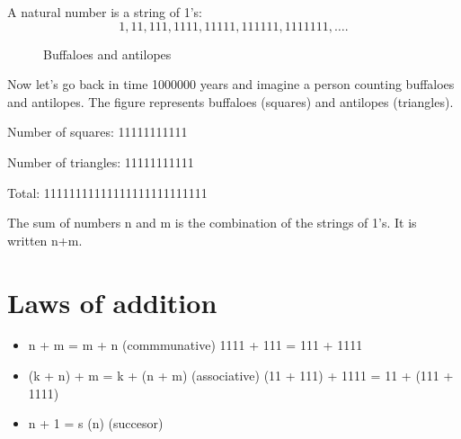 
\begin{definition}
    A natural number is a string of 1's:
    \[
        1,11,111,1111,11111,111111,1111111, \ldots
    .\]
\end{definition}


\begin{figure}[ht]
    \centering
    \caption{Buffaloes and antilopes}
    \label{fig:buffaloes-and-antilopes}
\end{figure}

Now let's go back in time 1000000 years and imagine a person counting buffaloes and antilopes.
The figure represents buffaloes (squares) and antilopes (triangles).

Number of squares: 11111111111

Number of triangles: 11111111111

Total: 11111111111111111111111111

\begin{definition}
    The sum of numbers n and m is the combination of the strings of 1's. It is
    written n+m.
\end{definition}

\section*{Laws of addition}
\begin{itemize}
    \item n + m = m + n (commmunative) \hspace{10} 1111 + 111 = 111 + 1111
    \item (k + n) + m = k + (n + m) (associative) \hspace{10} (11 + 111) + 1111 = 11 + (111 + 1111)
    \item n + 1 = s (n) (succesor) \hspace{10}
\end{itemize}


